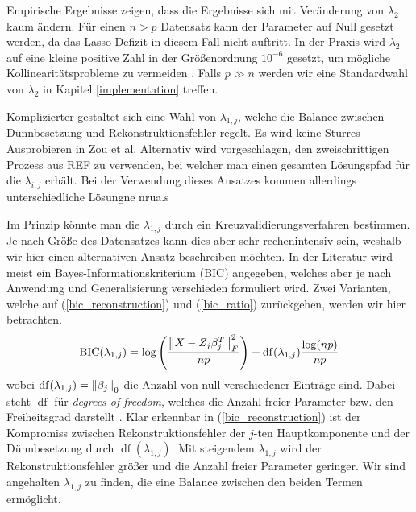 Empirische Ergebnisse zeigen, dass die Ergebnisse sich mit Veränderung von $\lambda_2$ kaum ändern. Für einen $n > p$ Datensatz kann der Parameter auf Null gesetzt werden, da das Lasso-Defizit in diesem Fall nicht auftritt. In der Praxis wird $\lambda_2$ auf eine kleine positive Zahl in der Größenordnung $10^{-6}$ gesetzt, um mögliche Kollinearitätsprobleme zu vermeiden \cite{zou_sparsepca}. Falls $p \gg n$ werden wir eine Standardwahl von $\lambda_2$ in Kapitel \ref{implementation} treffen.

Komplizierter gestaltet sich eine Wahl von $\lambda_{1,j}$, welche die Balance zwischen Dünnbesetzung und Rekonstruktionsfehler regelt. Es wird keine Sturres Ausprobieren in Zou et al. Alternativ wird vorgeschlagen, den zweischrittigen Prozess aus REF zu verwenden, bei welcher man einen gesamten Lösungspfad für die $\lambda_{i,j}$ erhält. Bei der Verwendung dieses Ansatzes kommen allerdings unterschiedliche Lösungne nrua.s

Im Prinzip könnte man die $\lambda_{1,j}$ durch ein Kreuzvalidierungsverfahren bestimmen. Je nach Größe des Datensatzes kann dies aber sehr rechenintensiv sein, weshalb wir hier einen alternativen Ansatz beschreiben möchten. In der Literatur wird meist ein Bayes-Informationskriterium (BIC) angegeben, welches aber je nach Anwendung und Generalisierung verschieden formuliert wird. Zwei Varianten, welche auf \cite{hubert, allen} (\ref{bic_reconstruction}) und \cite{croux, guo} (\ref{bic_ratio}) zurückgehen, werden wir hier betrachten.
\begin{align}
\label{bic_reconstruction}
\operatorname{BIC}(\lambda_{1,j}) = \log\left(\frac{\left\lVert X - Z_j\beta_j^T \right\rVert_{F}^{2}}{np}\right) + \operatorname{df}(\lambda_{1,j}) \frac{\log(np)}{np}
\end{align}
wobei $\operatorname{df}(\lambda_{1,j}) = \left\lVert \beta_j \right\rVert_0$ die Anzahl von null verschiedener Einträge sind. Dabei steht $\operatorname{df}$ für \textit{degrees of freedom}, welches die Anzahl freier Parameter bzw. den Freiheitsgrad darstellt \cite{hastie_elements}. Klar erkennbar in (\ref{bic_reconstruction}) ist der Kompromiss zwischen Rekonstruktionsfehler der $j$-ten Hauptkomponente und der Dünnbesetzung durch $\operatorname{df}(\lambda_{1,j})$. Mit steigendem $\lambda_{1,j}$ wird der Rekonstruktionsfehler größer und die Anzahl freier Parameter geringer. Wir sind angehalten $\lambda_{1,j}$ zu finden, die eine Balance zwischen den beiden Termen ermöglicht.

